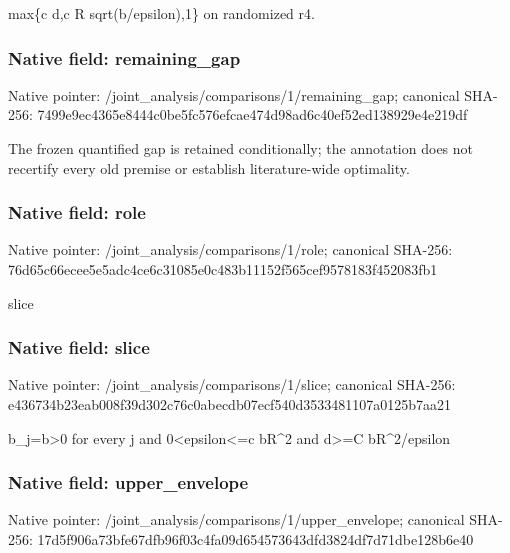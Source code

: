 \documentclass[10pt,a4paper]{article}
\begin{document}
\begingroup\raggedright\sloppy max\{c d,\allowbreak{}c R sqrt(b/\allowbreak{}epsilon),\allowbreak{}1\} on randomized r4.\par\endgroup

\subsubsection{Native field: remaining\_\allowbreak{}gap}
Native pointer: /joint\_\allowbreak{}analysis/comparisons/1/remaining\_\allowbreak{}gap; canonical SHA-256: 7499e9ec4365e8444c0be5fc576efcae474d98ad6c40ef52ed138929e4e219df

\begingroup\raggedright\sloppy The frozen quantified gap is retained conditionally;\allowbreak{} the annotation does not recertify every old premise or establish literature-wide optimality.\par\endgroup

\subsubsection{Native field: role}
Native pointer: /joint\_\allowbreak{}analysis/comparisons/1/role; canonical SHA-256: 76d65c66ecee5e5adc4ce6c31085e0c483b11152f565cef9578183f452083fb1

\begingroup\raggedright\sloppy slice\par\endgroup

\subsubsection{Native field: slice}
Native pointer: /joint\_\allowbreak{}analysis/comparisons/1/slice; canonical SHA-256: e436734b23eab008f39d302c76c0abecdb07ecf540d3533481107a0125b7aa21

\begingroup\raggedright\sloppy b\_\allowbreak{}j=\allowbreak{}b>0 for every j and 0<epsilon<=\allowbreak{}c bR\textasciicircum{}2 and d>=\allowbreak{}C bR\textasciicircum{}2/\allowbreak{}epsilon\par\endgroup

\subsubsection{Native field: upper\_\allowbreak{}envelope}
Native pointer: /joint\_\allowbreak{}analysis/comparisons/1/upper\_\allowbreak{}envelope; canonical SHA-256: 17d5f906a73bfe67dfb96f03c4fa09d654573643dfd3824df7d71dbe128b6e40
\end{document}
